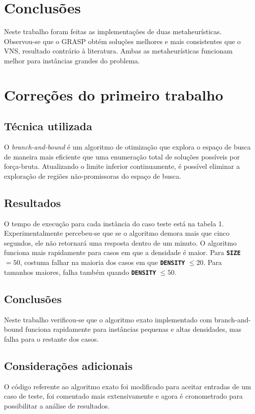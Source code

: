 \documentclass[12pt, a4paper]{article}
\newcommand{\ic}[1]{\textbf{\lstinline{#1}}}
\begin{document}
\section{Conclusões}
Neste trabalho foram feitas as implementações de duas metaheurísticas.
Observou-se que o GRASP obtém soluções melhores e mais consistentes que o VNS,
resultado contrário à literatura. Ambas as metaheurísticas funcionam melhor
para instâncias grandes do problema.

\section{Correções do primeiro trabalho}
\subsection{Técnica utilizada}
O \emph{branch-and-bound} é um algoritmo de otimização que explora o espaço de
busca de maneira mais eficiente que uma enumeração total de soluções possíveis
por força-bruta.  Atualizando o limite inferior continuamente, é possível
eliminar a exploração de regiões não-promissoras do espaço de busca.

\subsection{Resultados}
O tempo de execução para cada instância do caso teste está na tabela 1.
Experimentalmente percebeu-se que se o algoritmo demora mais que cinco
segundos, ele não retornará uma resposta dentro de um minuto. O algoritmo
funciona mais rapidamente para casos em que a densidade é maior. Para \ic{SIZE}
$ = 50 $, costuma falhar na maioria dos casos em que \ic{DENSITY} $ \leq 20 $.
Para tamanhos maiores, falha também quando \ic{DENSITY} $ \leq 50 $.

\subsection{Conclusões}
Neste trabalho verificou-se que o algoritmo exato implementado com
branch-and-bound funciona rapidamente para instâncias pequenas e altas
densidades, mas falha para o restante dos casos.

\subsection{Considerações adicionais}
O código referente ao algoritmo exato foi modificado para aceitar entradas de
um caso de teste, foi comentado mais extensivamente e agora é cronometrado para
possibilitar a análise de resultados.
\end{document}
